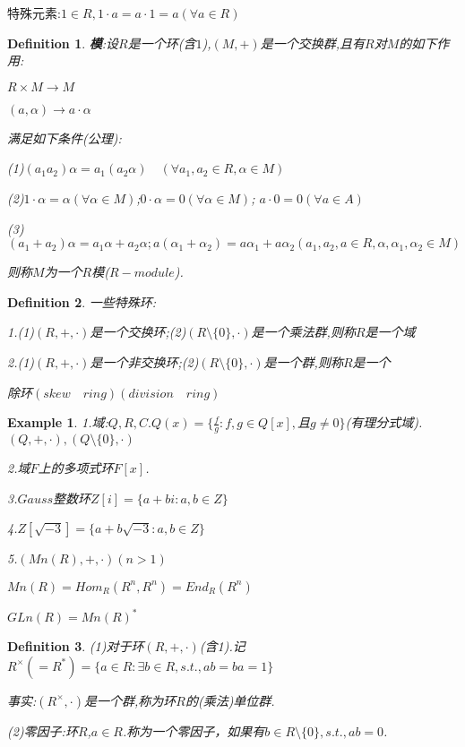 \documentclass[UTF8]{article}
\newtheorem{defn}{Definition}[section]
\newtheorem{exa}{Example}[section]
\begin{document}
特殊元素:$1\in R,1\cdot a=a\cdot 1=a(\forall a\in R)$

\begin{defn}
	\textbf{模}:设$R$是一个环(含$1$),$(M,+)$是一个交换群,且有$R$对$M$的如下作用:
	\begin{center}
		$R\times M\rightarrow M$
		
		$(a,\alpha)\rightarrow a\cdot \alpha$
	\end{center}
	
	满足如下条件(公理):
	
	(1)$(a_1a_2)\alpha=a_1(a_2\alpha)\quad (\forall a_1,a_2\in R,\alpha\in M)$
	
	(2)$1\cdot\alpha=\alpha(\forall \alpha\in M)$;$0\cdot\alpha=0(\forall \alpha\in M)$;
	$a\cdot 0=0(\forall a\in A)$
	
	(3)$(a_1+a_2)\alpha=a_1\alpha+a_2\alpha;a(\alpha_1+\alpha_2)=a\alpha_1+a\alpha_2
	(a_1,a_2,a\in R,\alpha,\alpha_1,\alpha_2\in M)$
	
	则称$M$为一个$R$模($R-module$).
\end{defn}

\begin{defn}
	一些特殊环:
	
	1.(1)$(R,+,\cdot)$是一个交换环;(2)$(R\setminus \{0\},\cdot)$是一个乘法群,则称$R$是一个域
	
	2.(1)$(R,+,\cdot)$是一个非交换环;(2)$(R\setminus \{0\},\cdot)$是一个群,则称$R$是一个
	
	除环$(skew\quad ring)(division\quad ring)$
\end{defn}

\begin{exa}
	
	1.域:$Q,R,C.Q(x)=\{\frac{f}{g}:f,g\in Q[x],$且$g\neq 0\}$(有理分式域).$(Q,+,\cdot),(Q\setminus \{0\},\cdot)$
	
	2.域$F$上的多项式环$F[x]$.
	
	3.$Gauss$整数环$Z[i]=\{a+bi:a,b\in Z\}$
	
	4.$Z[\sqrt{-3}]=\{a+b\sqrt{-3}:a,b\in Z\}$
	
	5.$(Mn(R),+,\cdot)(n>1)$
	
	$Mn(R)=Hom_R(R^n,R^n)=End_R(R^n)$
	
	$GLn(R)=Mn(R)^*$
\end{exa}

\begin{defn}
	(1)对于环$(R,+,\cdot)$(含1).记$R^\times(=R^*)=\{a\in R:\exists b\in R,s.t.,ab=ba=1\}$
	
	事实:$(R^\times,\cdot)$是一个群,称为环$R$的(乘法)单位群.
	
	(2)零因子:环$R$,$a\in R$.称为一个零因子，如果有$b\in R\setminus \{0\},s.t.,ab=0$.
\end{defn}
\end{document}
